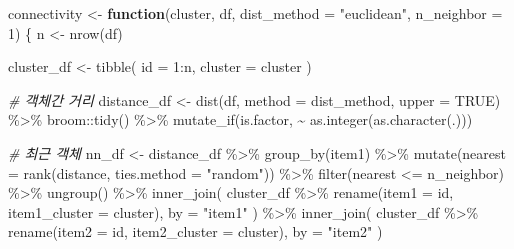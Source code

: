 \documentclass[
]{book}
\newenvironment{Shaded}{\begin{snugshade}}{\end{snugshade}}
\newcommand{\AttributeTok}[1]{\textcolor[rgb]{0.77,0.63,0.00}{#1}}
\newcommand{\CommentTok}[1]{\textcolor[rgb]{0.56,0.35,0.01}{\textit{#1}}}
\newcommand{\ConstantTok}[1]{\textcolor[rgb]{0.00,0.00,0.00}{#1}}
\newcommand{\ControlFlowTok}[1]{\textcolor[rgb]{0.13,0.29,0.53}{\textbf{#1}}}
\newcommand{\DecValTok}[1]{\textcolor[rgb]{0.00,0.00,0.81}{#1}}
\newcommand{\FunctionTok}[1]{\textcolor[rgb]{0.00,0.00,0.00}{#1}}
\newcommand{\NormalTok}[1]{#1}
\newcommand{\OtherTok}[1]{\textcolor[rgb]{0.56,0.35,0.01}{#1}}
\newcommand{\SpecialCharTok}[1]{\textcolor[rgb]{0.00,0.00,0.00}{#1}}
\newcommand{\StringTok}[1]{\textcolor[rgb]{0.31,0.60,0.02}{#1}}
\begin{document}
\begin{Shaded}
\begin{Highlighting}[]
\NormalTok{connectivity }\OtherTok{\textless{}{-}} \ControlFlowTok{function}\NormalTok{(cluster, df, }\AttributeTok{dist\_method =} \StringTok{"euclidean"}\NormalTok{, }\AttributeTok{n\_neighbor =} \DecValTok{1}\NormalTok{) \{}
\NormalTok{  n }\OtherTok{\textless{}{-}} \FunctionTok{nrow}\NormalTok{(df)}
  
\NormalTok{  cluster\_df }\OtherTok{\textless{}{-}} \FunctionTok{tibble}\NormalTok{(}
    \AttributeTok{id =} \DecValTok{1}\SpecialCharTok{:}\NormalTok{n,}
    \AttributeTok{cluster =}\NormalTok{ cluster}
\NormalTok{  )}

  \CommentTok{\# 객체간 거리}
\NormalTok{  distance\_df }\OtherTok{\textless{}{-}} \FunctionTok{dist}\NormalTok{(df, }\AttributeTok{method =}\NormalTok{ dist\_method, }\AttributeTok{upper =} \ConstantTok{TRUE}\NormalTok{) }\SpecialCharTok{\%\textgreater{}\%}
\NormalTok{    broom}\SpecialCharTok{::}\FunctionTok{tidy}\NormalTok{() }\SpecialCharTok{\%\textgreater{}\%}
    \FunctionTok{mutate\_if}\NormalTok{(is.factor, }\SpecialCharTok{\textasciitilde{}} \FunctionTok{as.integer}\NormalTok{(}\FunctionTok{as.character}\NormalTok{(.)))}
  
  \CommentTok{\# 최근 객체}
\NormalTok{  nn\_df }\OtherTok{\textless{}{-}}\NormalTok{ distance\_df }\SpecialCharTok{\%\textgreater{}\%}
    \FunctionTok{group\_by}\NormalTok{(item1) }\SpecialCharTok{\%\textgreater{}\%}
    \FunctionTok{mutate}\NormalTok{(}\AttributeTok{nearest =} \FunctionTok{rank}\NormalTok{(distance, }\AttributeTok{ties.method =} \StringTok{"random"}\NormalTok{)) }\SpecialCharTok{\%\textgreater{}\%}
    \FunctionTok{filter}\NormalTok{(nearest }\SpecialCharTok{\textless{}=}\NormalTok{ n\_neighbor) }\SpecialCharTok{\%\textgreater{}\%}
    \FunctionTok{ungroup}\NormalTok{() }\SpecialCharTok{\%\textgreater{}\%}
    \FunctionTok{inner\_join}\NormalTok{(}
\NormalTok{      cluster\_df }\SpecialCharTok{\%\textgreater{}\%} \FunctionTok{rename}\NormalTok{(}\AttributeTok{item1 =}\NormalTok{ id, }\AttributeTok{item1\_cluster =}\NormalTok{ cluster),}
      \AttributeTok{by =} \StringTok{"item1"}
\NormalTok{      ) }\SpecialCharTok{\%\textgreater{}\%}
    \FunctionTok{inner\_join}\NormalTok{(}
\NormalTok{      cluster\_df }\SpecialCharTok{\%\textgreater{}\%} \FunctionTok{rename}\NormalTok{(}\AttributeTok{item2 =}\NormalTok{ id, }\AttributeTok{item2\_cluster =}\NormalTok{ cluster),}
      \AttributeTok{by =} \StringTok{"item2"}
\NormalTok{    )}
  

\end{Highlighting}
\end{Shaded}
\end{document}
